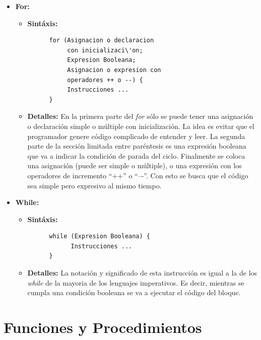 \documentclass[11pt, spanish]{report}
\begin{document}
\begin{itemize}
\item \textbf{For:}

  \begin{itemize}
  \item \textbf{Sint\'axis:}
    \begin{verbatim}
      for (Asignacion o declaracion 
           con inicializaci\'on; 
           Expresion Booleana;
           Asignacion o expresion con 
           operadores ++ o --) {
           Instrucciones ...
      }
    \end{verbatim}

  \item \textbf{Detalles:}    
    En la primera parte del \emph{for} s\'olo se puede tener una asignaci\'on o declaraci\'on simple o m\'ultiple con inicializaci\'on. La idea es evitar que el programador genere 
    c\'odigo complicado de entender y leer. La segunda parte de la secci\'on limitada entre par\'entesis es una expresi\'on booleana que va a indicar la condici\'on de parada del ciclo. 
    Finalmente se coloca una asignaci\'on (puede ser simple o m\'ultiple), o una expresi\'on con los operadores de incremento ``++'' o  ``–-''. Con esto se busca que el 
    c\'odigo sea simple pero expresivo al mismo tiempo.\\
  \end{itemize}

\item \textbf{While:}

  \begin{itemize}
  \item \textbf{Sint\'axis:}
    \begin{verbatim}
      while (Expresion Booleana) {
            Instrucciones ...
      }
    \end{verbatim}

  \item \textbf{Detalles:}    
    La notaci\'on y significado de esta instrucci\'on es igual a la de los \emph{while} de la mayoria de los lenguajes imperativos. Es decir, mientras
    se cumpla una condici\'on booleana se va a ejecutar el c\'odigo del bloque.\\
  \end{itemize}  
\end{itemize}

\section{Funciones y Procedimientos}
\end{document}
